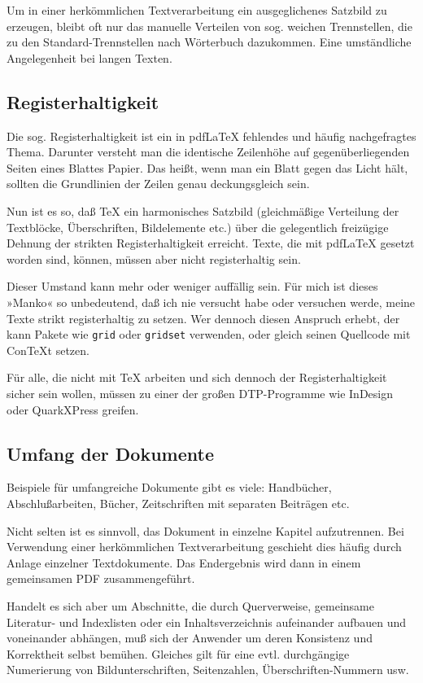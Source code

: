 \documentclass[11pt,a4paper,ngerman,DIV=8]{scrartcl}
\begin{document}
Um in einer herkömmlichen Textverarbeitung ein ausgeglichenes Satzbild zu erzeugen, bleibt oft nur das manuelle Verteilen von sog. weichen Trennstellen, die zu den Standard-Trennstellen nach Wörterbuch dazukommen. Eine umständliche Angelegenheit bei langen Texten.

\subsection{Registerhaltigkeit}

Die sog. Registerhaltigkeit ist ein in pdf\LaTeX{} fehlendes und häufig nachgefragtes Thema. Darunter versteht man die identische Zeilenhöhe auf gegenüberliegenden Seiten eines Blattes Papier. Das heißt, wenn man ein Blatt gegen das Licht hält, sollten die Grundlinien der Zeilen genau deckungsgleich sein.

Nun ist es so, daß \TeX{} ein harmonisches Satzbild (gleichmäßige Verteilung der Textblöcke, Überschriften, Bildelemente etc.) über die gelegentlich freizügige Dehnung der strikten Registerhaltigkeit erreicht. Texte, die mit pdf\LaTeX{} gesetzt worden sind, können, müssen aber nicht registerhaltig sein.

Dieser Umstand kann mehr oder weniger auffällig sein. Für mich ist dieses »Manko« so unbedeutend, daß ich nie versucht habe oder versuchen werde, meine Texte strikt registerhaltig zu setzen. Wer dennoch diesen Anspruch erhebt, der kann Pakete wie \texttt{grid} oder \texttt{gridset} verwenden, oder gleich seinen Quellcode mit Con\TeX{}t setzen.

Für alle, die nicht mit \TeX{} arbeiten und sich dennoch der Registerhaltigkeit sicher sein wollen, müssen zu einer der großen DTP-Programme wie InDesign oder QuarkXPress greifen.

\subsection{Umfang der Dokumente}

Beispiele für umfangreiche Dokumente gibt es viele: Handbücher, Abschlußarbeiten, Bücher, Zeitschriften mit separaten Beiträgen etc.

Nicht selten ist es sinnvoll, das Dokument in einzelne Kapitel aufzutrennen. Bei Verwendung einer herkömmlichen Textverarbeitung geschieht dies häufig durch Anlage einzelner Textdokumente. Das Endergebnis wird dann in einem gemeinsamen PDF zusammengeführt.

Handelt es sich aber um Abschnitte, die durch Querverweise, gemeinsame Literatur- und Indexlisten oder ein Inhaltsverzeichnis aufeinander aufbauen und voneinander abhängen, muß sich der Anwender um deren Konsistenz und Korrektheit selbst bemühen. Gleiches gilt für eine evtl. durchgängige Numerierung von Bildunterschriften, Seitenzahlen, Überschriften-Nummern usw.
\end{document}
